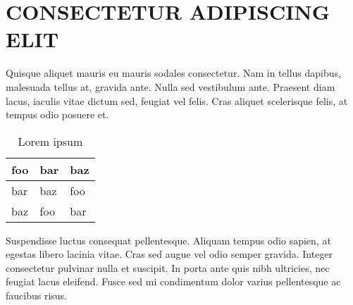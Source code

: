 \documentclass[letterpaper]{kuthesis}
\begin{document}
\chapter{CONSECTETUR ADIPISCING ELIT}
\setcounter{figure}{0} %
\setcounter{table}{0}
Quisque aliquet mauris eu mauris sodales consectetur. Nam in tellus dapibus, malesuada tellus at, gravida ante. Nulla sed vestibulum ante. Praesent diam lacus, iaculis vitae dictum sed, feugiat vel felis. Cras aliquet scelerisque felis, at tempus odio posuere et. 
\begin{table}[h]
\centering
\caption{Lorem ipsum}
\begin{tabular}{|l|l|l|}
\hline
foo & bar & baz \\ \hline
bar & baz & foo \\ \hline
baz & foo & bar \\ \hline
\end{tabular}
\label{table:b1}
\end{table}
Suspendisse luctus consequat pellentesque. Aliquam tempus odio sapien, at egestas libero lacinia vitae. Cras sed augue vel odio semper gravida. Integer consectetur pulvinar nulla et suscipit. In porta ante quis nibh ultricies, nec feugiat lacus eleifend. Fusce sed mi condimentum dolor varius pellentesque ac faucibus risus.

\end{document}
